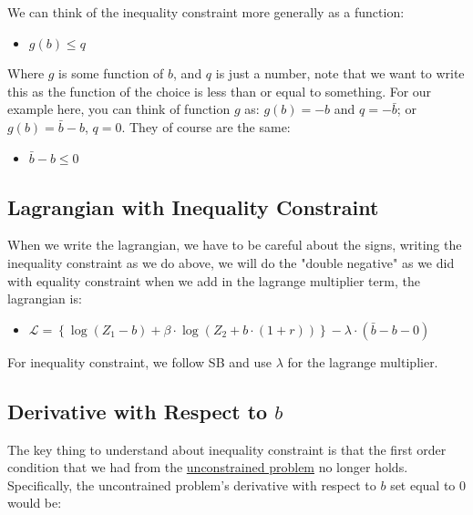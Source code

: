 \documentclass[
]{book}
\providecommand{\tightlist}{%
  \setlength{\itemsep}{0pt}\setlength{\parskip}{0pt}}
\begin{document}
We can think of the inequality constraint more generally as a function:

\begin{itemize}
\tightlist
\item
  \(\displaystyle g(b)\le q\)
\end{itemize}

Where \(g\) is some function of \(b\), and \(q\) is just a number, note that
we want to write this as the function of the choice is less than or
equal to something. For our example here, you can think of function \(g\)
as: \(g(b)=-b\) and \(q=-\bar{b}\); or \(g(b)=\bar{b} -b\), \(q=0\). They of
course are the same:

\begin{itemize}
\tightlist
\item
  \(\displaystyle \bar{b} -b\le 0\)
\end{itemize}

\hypertarget{lagrangian-with-inequality-constraint}{%
\subsection{Lagrangian with Inequality Constraint}\label{lagrangian-with-inequality-constraint}}

When we write the lagrangian, we have to be careful about the signs,
writing the inequality constraint as we do above, we will do the
"double negative" as we did with equality constraint when we add in
the lagrange multiplier term, the lagrangian is:

\begin{itemize}
\tightlist
\item
  \(\displaystyle \mathcal{L}=\left\lbrace \log (Z_1 -b)+\beta \cdot \log (Z_2 +b\cdot (1+r))\right\rbrace -\lambda \cdot (\bar{b} -b-0)\)
\end{itemize}

For inequality constraint, we follow SB and use \(\lambda\) for the
lagrange multiplier.

\hypertarget{derivative-with-respect-to-b}{%
\subsection{\texorpdfstring{Derivative with Respect to \(b\)}{Derivative with Respect to b}}\label{derivative-with-respect-to-b}}

The key thing to understand about inequality constraint is that the
first order condition that we had from the \href{https://fanwangecon.github.io/Math4Econ/derivative_application/K_save_households.html}{unconstrained
problem}
no longer holds. Specifically, the uncontrained problem's derivative
with respect to \(b\) set equal to \(0\) would be:
\end{document}
